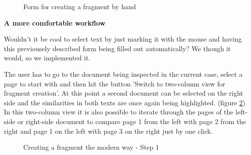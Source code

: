 \begin{figure}[!h]
  \centering
  \caption{Form for creating a fragment by hand}
  \label{fig:fragment-form}
\end{figure}

\textbf{A more comfortable workflow}

Wouldn't it be cool to select text by just marking it with the mouse and having this previousely described form being filled out automatically? We though it would, so we implemented it. 

The user has to go to the document being inspected in the current case, select a page to start with and then hit the button 'Switch to two-column view for fragment creation'. At this point a second document can be selected on the right side and the similarities in both texts are once again being highlighted. (figure \ref{fig:creating-fragment-modern-way-1}) In this two-column view it is also possible to iterate through the pages of the left-side or right-side document to compare page 1 from the left with page 2 from the right and page 1 on the left with page 3 on the right just by one click.

\begin{figure}[!h]
  \centering
  \caption{Creating a fragment the modern way - Step 1}
  \label{fig:creating-fragment-modern-way-1}
\end{figure}

